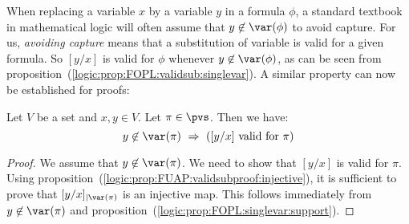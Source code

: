 When replacing a variable $x$ by a variable $y$ in a formula $\phi$,
a standard textbook in mathematical logic will often assume that
$y\not\in\var(\phi)$ to avoid capture. For us, {\em avoiding
capture} means that a substitution of variable is valid for a given
formula. So $[y/x]$ is valid for $\phi$ whenever
$y\not\in\var(\phi)$, as can be seen from
proposition~(\ref{logic:prop:FOPL:validsub:singlevar}). A similar
property can now be established for proofs:
\begin{prop}\label{logic:prop:FUAP:validsubproof:singlevar}
Let $V$ be a set and $x,y\in V$. Let $\pi\in\pvs$. Then we have:
    \[
    y\not\in\var(\pi)\ \Rightarrow\ (\mbox{$[y/x]$ valid for
    $\pi$})
    \]
\end{prop}
\begin{proof}
We assume that $y\not\in\var(\pi)$. We need to show that $[y/x]$ is
valid for $\pi$. Using
proposition~(\ref{logic:prop:FUAP:validsubproof:injective}), it is
sufficient to prove that $[y/x]_{|\var(\pi)}$ is an injective map.
This follows immediately from $y\not\in\var(\pi)$ and
proposition~(\ref{logic:prop:FOPL:singlevar:support}).
\end{proof}


